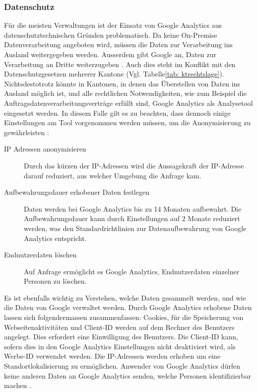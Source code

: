 \subsubsection{Datenschutz}
Für die meisten Verwaltungen ist der Einsatz von Google Analytics aus datenschutztechnischen Gründen problematisch. Da keine On-Premise Datenverarbeitung angeboten wird, müssen die Daten zur Verarbeitung ins Ausland weitergegeben werden. Ausserdem gibt Google an, Daten zur Verarbeitung an Dritte weiterzugeben \parencite{GoogleInfoSharing}. Auch dies steht im Konflikt mit den Datenschutzgesetzen mehrerer Kantone (Vgl. Tabelle\ref{tab: ktrechtslage}). Nichtsdestotrotz könnte in Kantonen, in denen das Überstellen von Daten ins Ausland möglich ist, und alle rechtlichen Notwendigkeiten, wie zum Beispiel die Auftragsdatenverarbeitungsverträge erfüllt sind, Google Analytics als Analysetool eingesetzt werden. In diesem Falle gilt es zu beachten, dass dennoch einige Einstellungen am Tool vorgenommen werden müssen, um die Anonymisierung zu gewährleisten \parencite{GoogleAnalyticsDatenschutzEinstellungen}: 

\begin{description}
  \item[IP Adressen anonymisieren] Durch das kürzen der IP-Adressen wird die Aussagekraft der IP-Adresse darauf reduziert, aus welcher Umgebung die Anfrage kam.
  \item[Aufbewahrungsdauer erhobener Daten festlegen] Daten werden bei Google Analytics bis zu 14 Monaten aufbewahrt. Die Aufbewahrungsdauer kann durch Einstellungen auf 2 Monate reduziert werden, was den Standardrichtlinien zur Datenaufbewahrung von Google Analytics entspricht.
  \item[Endnutzerdaten löschen] Auf Anfrage ermöglicht es Google Analytics, Endnutzerdaten einzelner Personen zu löschen.   
\end{description} 

Es ist ebenfalls wichtig zu Verstehen, welche Daten gesammelt werden, und wie die Daten von Google verwaltet werden. Durch Google Analytics erhobene Daten lassen sich folgendermassen zusammenfassen: Cookies, für die Speicherung von Webseitenaktivitäten und Client-ID werden auf dem Rechner des Benutzers angelegt. Dies erfordert eine Einwilligung des Benutzers. Die Client-ID kann, sofern dies in den Google Analytics Einstellungen nicht deaktiviert wird, als Werbe-ID verwendet werden. Die IP-Adressen werden erhoben um eine Standortlokalisierung zu ermöglichen. Anwender von Google Analytics dürfen keine anderen Daten an Google Analytics senden, welche Personen identifizierbar machen \parencite{GoogleAnalyticsDatenschutz}.

